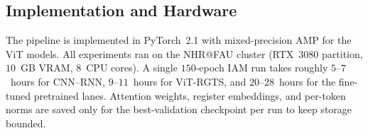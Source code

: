 \subsection{Implementation and Hardware}
\label{sec:impl}

The pipeline is implemented in PyTorch~2.1 with mixed-precision AMP for the ViT models. All experiments ran on the NHR@FAU cluster (RTX~3080 partition, $10$~GB VRAM, $8$~CPU cores). A single $150$-epoch IAM run takes roughly $5$--$7$~hours for CNN--RNN, $9$--$11$~hours for ViT-RGTS, and $20$--$28$~hours for the fine-tuned pretrained lanes. Attention weights, register embeddings, and per-token norms are saved only for the best-validation checkpoint per run to keep storage bounded.
